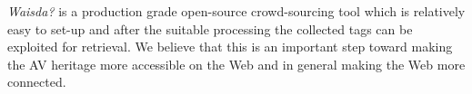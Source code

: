 \textit{Waisda?} is a production grade open-source crowd-sourcing tool which is relatively easy to set-up and after the suitable processing the collected tags can be exploited for retrieval. We believe that this is an important step toward making the AV heritage more accessible on the Web and in general making the Web more connected.
